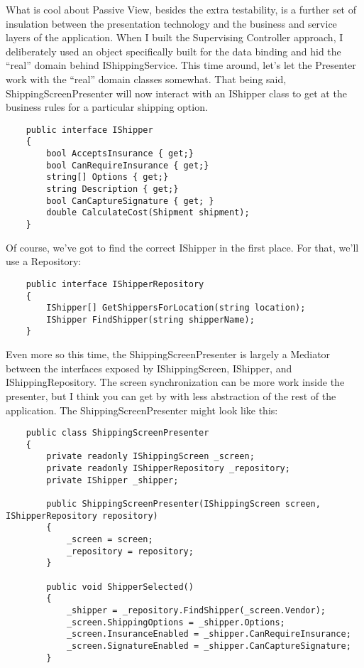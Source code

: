 \documentclass{article}
\begin{document}
{What is cool about Passive View, besides the extra testability, is a further set of insulation between the presentation technology and the business and service layers of the application.  When I built the Supervising Controller approach, I deliberately used an object specifically built for the data binding and hid the “real” domain behind IShippingService.  This time around, let's let the Presenter work with the “real” domain classes somewhat.  That being said, ShippingScreenPresenter will now interact with an IShipper class to get at the business rules for a particular shipping option. 
\begin{lstlisting}
    public interface IShipper
    {
        bool AcceptsInsurance { get;}
        bool CanRequireInsurance { get;}
        string[] Options { get;}
        string Description { get;}
        bool CanCaptureSignature { get; }
        double CalculateCost(Shipment shipment);
    }
\end{lstlisting}
Of course, we've got to find the correct IShipper in the first place.  For that, we'll use a Repository:
\begin{lstlisting}
    public interface IShipperRepository
    {
        IShipper[] GetShippersForLocation(string location);
        IShipper FindShipper(string shipperName);
    }
\end{lstlisting}
Even more so this time, the ShippingScreenPresenter is largely a Mediator between the interfaces exposed by IShippingScreen, IShipper, and IShippingRepository.  The screen synchronization can be more work inside the presenter, but I think you can get by with less abstraction of the rest of the application.  The ShippingScreenPresenter might look like this:
\newpage
\begin{lstlisting}
    public class ShippingScreenPresenter
    {
        private readonly IShippingScreen _screen;
        private readonly IShipperRepository _repository;
        private IShipper _shipper; 

        public ShippingScreenPresenter(IShippingScreen screen, IShipperRepository repository)
        {
            _screen = screen;
            _repository = repository;
        } 

        public void ShipperSelected()
        {
            _shipper = _repository.FindShipper(_screen.Vendor);
            _screen.ShippingOptions = _shipper.Options;
            _screen.InsuranceEnabled = _shipper.CanRequireInsurance;
            _screen.SignatureEnabled = _shipper.CanCaptureSignature;
        }


\end{lstlisting}}
\end{document}
